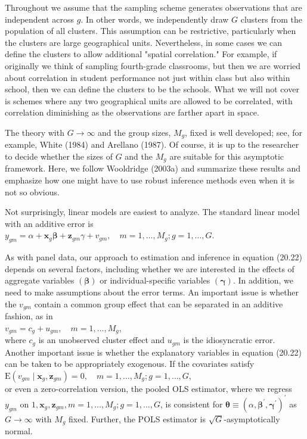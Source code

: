 \documentclass[10pt]{article}
\begin{document}
Throughout we assume that the sampling scheme generates observations that are independent across $g$. In other words, we independently draw $G$ clusters from the population of all clusters. This assumption can be restrictive, particularly when the clusters are large geographical units. Nevertheless, in some cases we can define the clusters to allow additional "spatial correlation." For example, if originally we think of sampling fourth-grade classrooms, but then we are worried about correlation in student performance not just within class but also within school, then we can define the clusters to be the schools. What we will not cover is schemes where any two geographical units are allowed to be correlated, with correlation diminishing as the observations are farther apart in space.

The theory with $G \rightarrow \infty$ and the group sizes, $M_{g}$, fixed is well developed; see, for example, White (1984) and Arellano (1987). Of course, it is up to the researcher to decide whether the sizes of $G$ and the $M_{g}$ are suitable for this asymptotic framework. Here, we follow Wooldridge (2003a) and summarize these results and emphasize how one might have to use robust inference methods even when it is not so obvious.

Not surprisingly, linear models are easiest to analyze. The standard linear model with an additive error is\\
$y_{g m}=\alpha+\mathbf{x}_{g} \boldsymbol{\beta}+\mathbf{z}_{g m} \gamma+v_{g m}, \quad m=1, \ldots, M_{g} ; g=1, \ldots, G$.

As with panel data, our approach to estimation and inference in equation (20.22) depends on several factors, including whether we are interested in the effects of aggregate variables $(\boldsymbol{\beta})$ or individual-specific variables $(\boldsymbol{\gamma})$. In addition, we need to make assumptions about the error terms. An important issue is whether the $v_{g m}$ contain a common group effect that can be separated in an additive fashion, as in\\
$v_{g m}=c_{g}+u_{g m}, \quad m=1, \ldots, M_{g}$,\\
where $c_{g}$ is an unobserved cluster effect and $u_{g m}$ is the idiosyncratic error. Another important issue is whether the explanatory variables in equation (20.22) can be taken to be appropriately exogenous. If the covariates satisfy\\
$\mathrm{E}\left(v_{g m} \mid \mathbf{x}_{g}, \mathbf{z}_{g m}\right)=0, \quad m=1, \ldots, M_{g} ; g=1, \ldots, G$,\\
or even a zero-correlation version, the pooled OLS estimator, where we regress $y_{g m}$ on $1, \mathbf{x}_{g}, \mathbf{z}_{g m}, m=1, \ldots, M_{g} ; g=1, \ldots, G$, is consistent for $\boldsymbol{\theta} \equiv\left(\alpha, \boldsymbol{\beta}^{\prime}, \boldsymbol{\gamma}^{\prime}\right)^{\prime}$ as $G \rightarrow \infty$ with $M_{g}$ fixed. Further, the POLS estimator is $\sqrt{G}$-asymptotically normal.
\end{document}
